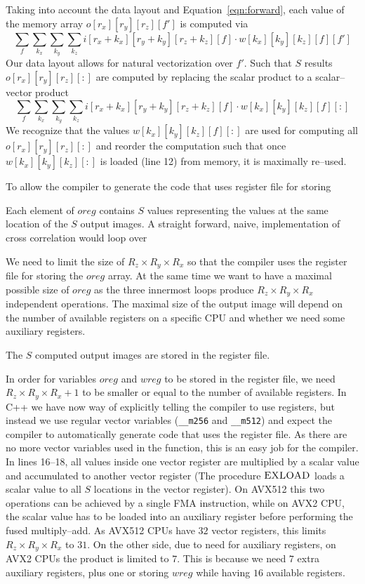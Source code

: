   Taking into account the data layout and Equation~\ref{eqn:forward},
  each value of the memory array $o[r_x][r_y][r_z][f']$ is computed
  via
  {\footnotesize
  \[
  \sum_{f} \sum_{k_x} \sum_{k_y} \sum_{k_z}
  i[r_x+k_x][r_y+k_y][r_z+k_z][f] \cdot w[k_x][k_y][k_z][f][f']
  \]
  } Our data layout allows for natural vectorization over $f'$.  Such
  that $S$ results $o[r_x][r_y][r_z][:]$ are computed by replacing the
  scalar product to a scalar--vector product
  {\footnotesize
  \[
  \sum_{f} \sum_{k_x} \sum_{k_y} \sum_{k_z}
  i[r_x+k_x][r_y+k_y][r_z+k_z][f] \cdot w[k_x][k_y][k_z][f][:]
  \]
  } We recognize that the values $w[k_x][k_y][k_z][f][:]$ are used for
  computing all $o[r_x][r_y][r_z][:]$ and reorder the computation such
  that once $w[k_x][k_y][k_z][:]$ is loaded (line 12) from memory, it
  is maximally re--used.

  To allow the compiler to generate the code that uses register file
  for storing




  Each element of $oreg$ contains $S$ values representing the values
  at the same location of the $S$ output images.  A straight forward,
  naive, implementation of cross correlation would loop over


We need to limit the
  size of $R_z \times R_y \times R_x$ so that the compiler uses the
  register file for storing the $oreg$ array.  At the same time we
  want to have a maximal possible size of $oreg$ as the three
  innermost loops produce $R_z \times R_y \times R_x$ independent
  operations.  The maximal size of the output image will depend on the
  number of available registers on a specific CPU and whether we need
  some auxiliary registers.



  The $S$ computed output images are stored in the register file.


  In order for variables $oreg$ and $wreg$ to be stored in the
  register file, we need $R_z \times R_y \times R_x + 1$ to be smaller
  or equal to the number of available registers.  In C++ we have now
  way of explicitly telling the compiler to use registers, but instead
  we use regular vector variables (\texttt{\_\_m256} and
  \texttt{\_\_m512}) and expect the compiler to automatically generate
  code that uses the register file.  As there are no more vector
  variables used in the function, this is an easy job for the
  compiler.  In lines 16--18, all values inside one vector register
  are multiplied by a scalar value and accumulated to another vector
  register (The procedure $\textnormal{\scshape EXLOAD}$ loads a scalar value to all
  $S$ locations in the vector register).  On AVX512 this two
  operations can be achieved by a single FMA instruction, while on
  AVX2 CPU, the scalar value has to be loaded into an auxiliary
  register before performing the fused multiply--add.  As AVX512 CPUs
  have $32$ vector registers, this limits $R_z \times R_y \times R_x$
  to $31$.  On the other side, due to need for auxiliary registers, on
  AVX2 CPUs the product is limited to $7$.  This is because we need
  $7$ extra auxiliary registers, plus one or storing $wreg$ while
  having $16$ available registers.

